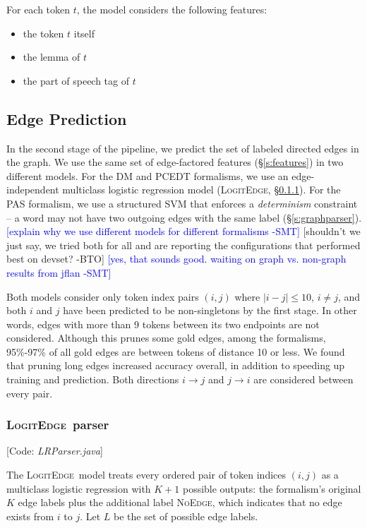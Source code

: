 \documentclass[11pt]{article}
\newcommand{\bocomment}[1]{\textcolor{Bittersweet}{[#1 -BTO]}}
\newcommand{\sam}[1]{\textcolor{blue}{[#1 -SMT]}}
\newcommand{\codenote}[1]{\textcolor{PineGreen}{[Code: \emph{#1}]}}
\newcommand{\logitedge}{\textsc{LogitEdge}}
\newcommand{\noedge}{\textsc{NoEdge}}
\begin{document}
For each token $t$, the model considers the following features:
\begin{itemize}
\item the token $t$ itself
\item the lemma of $t$
\item the part of speech tag of $t$
\end{itemize}



\subsection{Edge Prediction} \label{s:edge_model}

In the second stage of the pipeline, we predict the set of labeled directed
edges in the graph.
We use the same set of edge-factored features (\S\ref{s:features}) in two
different models.
For the DM and PCEDT formalisms, we use an edge-independent multiclass logistic
regression model (\logitedge, \S\ref{s:logitedge}).
For the PAS formalism, we use a structured SVM 
\cite{taskar_max_2003,tsochantaridis_support_2004} that enforces a
\emph{determinism} constraint -- a word may not have two outgoing edges with the
same label (\S\ref{s:graphparser}).
\sam{explain why we use different models for different formalisms}
\bocomment{shouldn't we just say, we tried both for all and are reporting the configurations that performed best on devset?}
\sam{yes, that sounds good. waiting on graph vs. non-graph results from jflan}

Both models consider only token index pairs $(i, j)$ where %
$|i-j| \leq 10$, $i \ne j$, and both $i$ and
$j$ have been predicted to be non-singletons by the first stage.
In other words, edges with more than 9 tokens between its two endpoints are not
considered.
Although this prunes some gold edges, among the formalisms,
95\%-97\% of all gold edges are between tokens of distance 10 or less.
We found that pruning long edges increased accuracy overall, in addition to
speeding up training and prediction.
Both directions $i \rightarrow j$ and $j \rightarrow
i$ are considered between every pair.


\subsubsection{\logitedge\ parser} 
\label{s:logitedge}


\codenote{LRParser.java}

The \logitedge\ model treats every ordered pair of token indices $(i, j)$ as a
multiclass logistic regression with $K+1$ possible outputs:
the formalism's original $K$ edge labels plus the additional label \noedge,
which indicates that no edge exists from $i$ to $j$.
Let $L$ be the set of possible edge labels.
\end{document}
